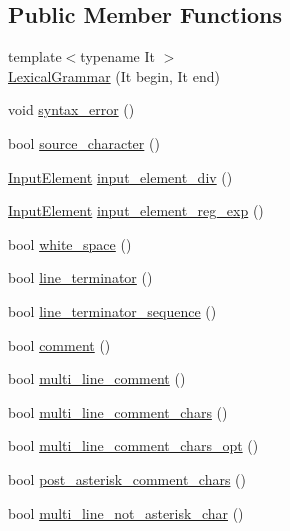 \subsection*{Public Member Functions}
\begin{DoxyCompactItemize}
\item 
{\footnotesize template$<$typename It $>$ }\\\hyperlink{class_lexical_grammar_ae00a07b2f2c282a59d8df82c0596cc04}{Lexical\+Grammar} (It begin, It end)
\item 
void \hyperlink{class_lexical_grammar_acccc5eb7a8e4f460f4123049889d8e4b}{syntax\+\_\+error} ()
\item 
bool \hyperlink{class_lexical_grammar_ad3f57a97b726239f8561556e2c920c09}{source\+\_\+character} ()
\item 
\hyperlink{class_input_element}{Input\+Element} \hyperlink{class_lexical_grammar_a6cb2dc7fbf0b773eb285bd70228abfd5}{input\+\_\+element\+\_\+div} ()
\item 
\hyperlink{class_input_element}{Input\+Element} \hyperlink{class_lexical_grammar_a9bb05f07c0d3941f11ac37d69e1e14fc}{input\+\_\+element\+\_\+reg\+\_\+exp} ()
\item 
bool \hyperlink{class_lexical_grammar_aa8d7fdc84e7ca55c85c67b2849e89ac2}{white\+\_\+space} ()
\item 
bool \hyperlink{class_lexical_grammar_ab0cbd5b59a7478d0f1042774b877714d}{line\+\_\+terminator} ()
\item 
bool \hyperlink{class_lexical_grammar_a43737fd87e454c3a426c047b02f376f6}{line\+\_\+terminator\+\_\+sequence} ()
\item 
bool \hyperlink{class_lexical_grammar_a342d05c7d8f59d5a4d0c7eb34fd97b3f}{comment} ()
\item 
bool \hyperlink{class_lexical_grammar_a9a4018bef475f8831e825ccc199a0baa}{multi\+\_\+line\+\_\+comment} ()
\item 
bool \hyperlink{class_lexical_grammar_a4f847dd31fc9ea84af23f03a7cf507eb}{multi\+\_\+line\+\_\+comment\+\_\+chars} ()
\item 
bool \hyperlink{class_lexical_grammar_aaf2e8e31825d9094dbd3c6f685448e14}{multi\+\_\+line\+\_\+comment\+\_\+chars\+\_\+opt} ()
\item 
bool \hyperlink{class_lexical_grammar_a87186e7112da8a1bd4abeb3edc07ff51}{post\+\_\+asterisk\+\_\+comment\+\_\+chars} ()
\item 
bool \hyperlink{class_lexical_grammar_a1f81a1a8b21254111cf4432bfbd17e15}{multi\+\_\+line\+\_\+not\+\_\+asterisk\+\_\+char} ()
\item 

\end{DoxyCompactItemize}
